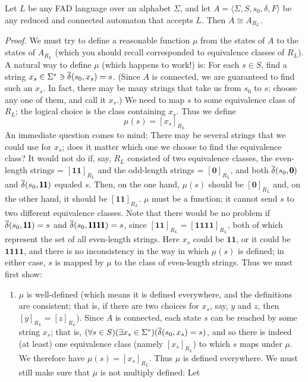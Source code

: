 \begin{thm}\label{thm-3.1}
Let $L$ be any FAD language over an alphabet $\Sigma$, and let
$A=\langle\Sigma,S,s_0,\delta,F\rangle$ be any reduced and connected automaton
that accepts $L$. Then $A \cong A_{R_L}$.

\emph{Proof.} We must try to define a reasonable function $\mu$ from the states
of $A$ to the states of $A_{R_L}$ (which you should recall corresponded to
equivalence classes of $R_L$). A natural way to define $\mu$ (which happens to
work!) is: For each $s \in S$, find a string $x_s \in \Sigma^* \ni
\overline{\delta}(s_0,x_s) = s$. (Since $A$ is connected, we are guaranteed to find such an
$x_s$. In fact, there may be many strings that take us from $s_0$ to $s$; choose
any one of them, and call it $x_s$.) We need to map $s$ to some equivalence
class of $R_L$; the logical choice is the class containing $x_s$. Thus we define
\[ \mu(s)=[x_s]_{R_L} \]
An immediate question comes to mind: There may be several strings that we could
use for $x_s$; does it matter which one we choose to find the equivalence class?
It would not do if, say, $R_L$ consisted of two equivalence classes, the
even-length strings = $[\pmb{11}]_{R_L}$ and the odd-length strings =
$[\pmb{0}]_{R_L}$, and both $\overline{\delta}(s_0,\pmb{0})$ and $\overline{\delta}(s_0,\pmb{11})$ equaled $s$. Then, on
the one hand, $\mu(s)$ should be $[\pmb{0}]_{R_L}$ and, on the other hand, it should
be $[\pmb{11}]_{R_L}$. $\mu$ must be a function; it cannot send $s$ to two different
equivalence classes. Note that there would be no problem if $\overline{\delta}(s_0,\pmb{11})=s$ 
and $\overline{\delta}(s_0,\pmb{1111}) = s$, since $[\pmb{11}]_{R_L}=[\pmb{1111}]_{R_L}$, both of which
represent the set of all even-length strings. Here $x_s$ could be $\pmb{11}$, or
it could be $\pmb{1111}$, and there is no inconsistency in the way in which
$\mu(s)$ is defined; in either case, $s$ is mapped by $\mu$ to the class of
even-length strings. Thus we must first show:
\begin{enumerate}
\item $\mu$ is well-defined (which means it is defined everywhere, and the
definitions are consistent; that is, if there are two choices for $x_s$, say,
$y$ and $z$, then $[y]_{R_L}=[z]_{R_L}$). Since $A$ is connected, each state $s$
can be reached by some string $x_s$; that is,
$(\forall s \in S)(\exists x_s \in \Sigma^*)(\overline{\delta}(s_0,x_s) = s)$, and so there
is indeed (at least) one equivalence class (namely $[x_s]_{R_L}$) to which $s$ maps
under $\mu$. We therefore have $\mu(s)=[x_s]_{R_L}$. Thus $\mu$ is defined
everywhere. We must still make sure that $\mu$ is not multiply defined: Let

\end{enumerate}
\end{thm}
